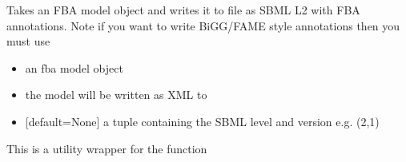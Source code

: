 \documentclass[letterpaper,10pt,english]{sphinxmanual}
\begin{document}
\begin{fulllineitems}
\label{\detokenize{modules_doc:cbmpy.CBWrite.writeSBML2FBA}}
\pysigstartsignatures
{}
\pysigstopsignatures
\sphinxAtStartPar
Takes an FBA model object and writes it to file as SBML L2 with FBA annotations.
Note if you want to write BiGG/FAME style annotations then you must use 
\begin{itemize}
\item {} 
\sphinxAtStartPar
{} an fba model object

\item {} 
\sphinxAtStartPar
{} the model will be written as XML to 

\item {} 
\sphinxAtStartPar
{} {[}default=None{]} a tuple containing the SBML level and version e.g. (2,1)

\end{itemize}

\sphinxAtStartPar
This is a utility wrapper for the function 

\end{fulllineitems}

\end{document}
